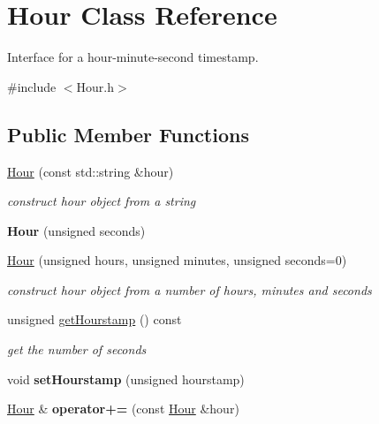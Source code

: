\hypertarget{class_hour}{}\section{Hour Class Reference}
\label{class_hour}


Interface for a hour-\/minute-\/second timestamp.  




{\ttfamily \#include $<$Hour.\+h$>$}

\subsection*{Public Member Functions}
\begin{DoxyCompactItemize}
\item 
\hyperlink{class_hour_a596868e9c3802335f81f538efc0911f3}{Hour} (const std\+::string \&hour)
\begin{DoxyCompactList}\small\item\em construct hour object from a string \end{DoxyCompactList}\item 
\hypertarget{class_hour_a2fd12606e010fc8a07af09de5cd28d83}{}{\bfseries Hour} (unsigned seconds)\label{class_hour_a2fd12606e010fc8a07af09de5cd28d83}

\item 
\hyperlink{class_hour_a3da244a601fba002d20eb9a7de724574}{Hour} (unsigned hours, unsigned minutes, unsigned seconds=0)
\begin{DoxyCompactList}\small\item\em construct hour object from a number of hours, minutes and seconds \end{DoxyCompactList}\item 
\hypertarget{class_hour_aa370ac8ba17cf52dc7f00e6f3b529c2b}{}unsigned \hyperlink{class_hour_aa370ac8ba17cf52dc7f00e6f3b529c2b}{get\+Hourstamp} () const \label{class_hour_aa370ac8ba17cf52dc7f00e6f3b529c2b}

\begin{DoxyCompactList}\small\item\em get the number of seconds \end{DoxyCompactList}\item 
\hypertarget{class_hour_a4aa915a1163bfbc028d2e31a6a8a3b90}{}void {\bfseries set\+Hourstamp} (unsigned hourstamp)\label{class_hour_a4aa915a1163bfbc028d2e31a6a8a3b90}

\item 
\hypertarget{class_hour_a07e78b2131a713ec25f88c459032987c}{}\hyperlink{class_hour}{Hour} \& {\bfseries operator+=} (const \hyperlink{class_hour}{Hour} \&hour)\label{class_hour_a07e78b2131a713ec25f88c459032987c}


\end{DoxyCompactItemize}
